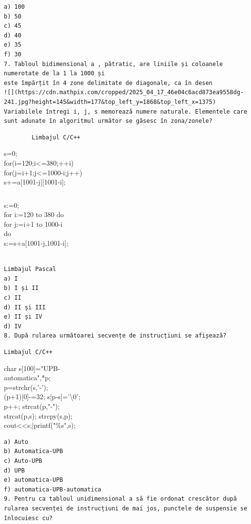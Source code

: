 \documentclass[10pt]{article}
\begin{document}
\begin{verbatim}
a) 100
b) 50
c) 45
d) 40
e) 35
f) 30
7. Tabloul bidimensional a , pătratic, are liniile și coloanele numerotate de la 1 la 1000 și
este împărțit în 4 zone delimitate de diagonale, ca în desen
![](https://cdn.mathpix.com/cropped/2025_04_17_46e04c6acd873ea9558dg-241.jpg?height=145&width=177&top_left_y=1868&top_left_x=1375) Variabilele întregi i, j, s memorează numere naturale. Elementele care sunt adunate în algoritmul următor se găsesc în zona/zonele?
\end{verbatim}

\begin{verbatim}
        Limbajul C/C++
\end{verbatim}

s=0;\\
for(i=120;i<=380;++i)\\
for(j=i+1;j<=1000-i;j++)\\[0pt]
s+=a[1001-j][1001-i];

\begin{verbatim}

\end{verbatim}

s:=0;\\
for i:=120 to 380 do\\
for j:=i+1 to 1000-i\\
do\\[0pt]
s:=s+a[1001-j,1001-i];

\begin{verbatim}

Limbajul Pascal
a) I
b) I și II
c) II
d) II și III
e) II și IV
d) IV
8. După rularea următoarei secvențe de instrucțiuni se afișează?
\end{verbatim}

\begin{verbatim}
Limbajul C/C++
\end{verbatim}

char s[100]="UPB-\\
automatica",*p;\\
p=strchr(s,'-');\\[0pt]
(p+1)[0]-=32; s[p-s]='\textbackslash 0';\\
p++; strcat(p,"-");\\
strcat(p,s); strcpy(s,p);\\
cout<<s;|printf("\%s",s);

\begin{verbatim}
a) Auto
b) Automatica-UPB
c) Auto-UPB
d) UPB
e) automatica-UPB
f) automatica-UPB-automatica
9. Pentru ca tabloul unidimensional a să fie ordonat crescător după rularea secvenței de instrucțiuni de mai jos, punctele de suspensie se înlocuiesc cu?
\end{verbatim}
\end{document}
